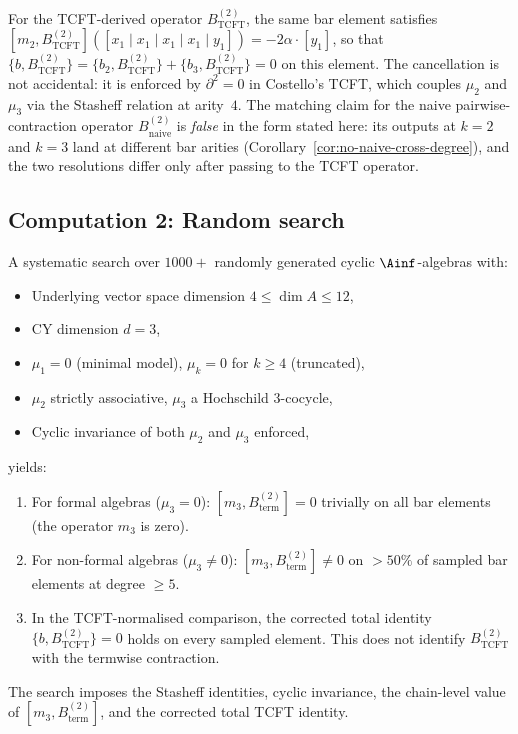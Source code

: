 \begin{remark}
\label{rem:b2-cancellation}
For the TCFT-derived operator $B^{(2)}_{\mathrm{TCFT}}$, the
same bar element satisfies
$[m_2, B^{(2)}_{\mathrm{TCFT}}]([x_1 \mid x_1 \mid x_1 \mid x_1 \mid y_1])
= -2\alpha \cdot [y_1]$, so that
$\{b, B^{(2)}_{\mathrm{TCFT}}\}
= \{b_2, B^{(2)}_{\mathrm{TCFT}}\}
 + \{b_3, B^{(2)}_{\mathrm{TCFT}}\} = 0$
on this element. The cancellation is not accidental: it is
enforced by $\partial^2 = 0$ in Costello's TCFT, which couples
$\mu_2$ and $\mu_3$ via the Stasheff relation at arity~$4$.
The matching claim for the naive pairwise-contraction
operator $B^{(2)}_{\mathrm{naive}}$ is \emph{false} in the form
stated here: its outputs at $k = 2$ and $k = 3$ land at
different bar arities (Corollary~\ref{cor:no-naive-cross-degree}),
and the two resolutions differ only after passing to the TCFT
operator.
\end{remark}


\subsection{Computation 2: Random search}
\label{subsec:comp-random}

\begin{computation}
\label{comp:random-search}
A systematic search over $1000+$ randomly generated cyclic
$\Ainf$-algebras with:
\begin{itemize}
 \item Underlying vector space dimension $4 \leq \dim A \leq 12$,
 \item CY dimension $d = 3$,
 \item $\mu_1 = 0$ (minimal model), $\mu_k = 0$ for $k \geq 4$
 (truncated),
 \item $\mu_2$ strictly associative, $\mu_3$ a Hochschild
 $3$-cocycle,
 \item Cyclic invariance of both $\mu_2$ and $\mu_3$ enforced,
\end{itemize}
yields:
\begin{enumerate}[label=\textup{(\roman*)}]
 \item For formal algebras ($\mu_3 = 0$):
 $[m_3, B^{(2)}_{\mathrm{term}}] = 0$ trivially on all bar elements
 (the operator $m_3$ is zero).
 \item For non-formal algebras ($\mu_3 \neq 0$):
 $[m_3, B^{(2)}_{\mathrm{term}}] \neq 0$ on $> 50\%$ of sampled bar elements
 at degree $\geq 5$.
 \item In the TCFT-normalised comparison, the corrected total
 identity $\{b, B^{(2)}_{\mathrm{TCFT}}\}=0$ holds on every sampled
 element.  This does not identify
 $B^{(2)}_{\mathrm{TCFT}}$ with the termwise contraction.
\end{enumerate}
The search imposes the Stasheff identities, cyclic invariance, the
chain-level value of $[m_3, B^{(2)}_{\mathrm{term}}]$, and the corrected
total TCFT identity.
\end{computation}


